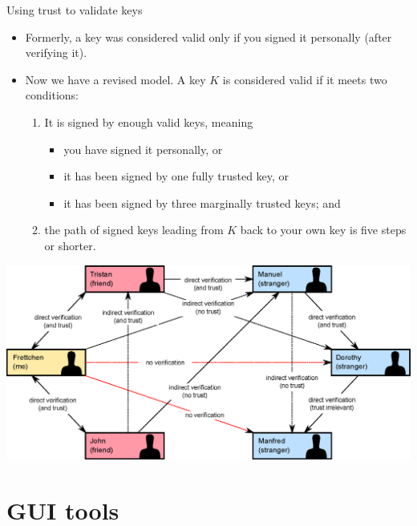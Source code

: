 \documentclass[%
mode=present,%
paper=smartboard,
size=20pt,
]{powerdot}
\begin{document}
\begin{slide}{Using trust to validate keys}
  \begin{itemize}
  \item Formerly, a key was considered valid only if you signed it
    personally (after verifying it).
  \item Now we have a revised model.  A key $K$ is considered valid if
    it meets two conditions:
    \begin{enumerate}
    \item It is signed by enough valid keys, meaning
      \begin{itemize}
      \item you have signed it personally, or
      \item it has been signed by one fully trusted key, or
      \item it has been signed by three marginally trusted keys; and
      \end{itemize}
    \item the path of signed keys leading from $K$ back to your own
      key is five steps or shorter.
    \end{enumerate}
  \end{itemize}
\end{slide}

\begin{slide}[toc=]{}
\centering\includegraphics[width=\linewidth]{images/Web_of_Trust_2.eps}
\end{slide}

\section{GUI tools}
\end{document}
